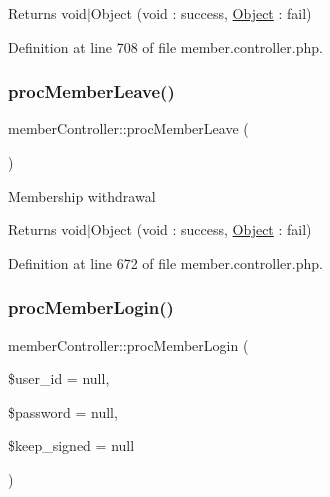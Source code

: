 \begin{DoxyReturn}{Returns}
void$\vert$\+Object (void \+: success, \hyperlink{classObject}{Object} \+: fail) 
\end{DoxyReturn}


Definition at line 708 of file member.\+controller.\+php.

\mbox{\label{classmemberController_a4c78a9114c62d27178d70bb4b8d19455}} 
\subsubsection{\texorpdfstring{proc\+Member\+Leave()}{procMemberLeave()}}
{\footnotesize\ttfamily member\+Controller\+::proc\+Member\+Leave (\begin{DoxyParamCaption}{ }\end{DoxyParamCaption})}

Membership withdrawal

\begin{DoxyReturn}{Returns}
void$\vert$\+Object (void \+: success, \hyperlink{classObject}{Object} \+: fail) 
\end{DoxyReturn}


Definition at line 672 of file member.\+controller.\+php.

\mbox{\label{classmemberController_a1e37a85198193c84a66b4472a677960d}} 
\subsubsection{\texorpdfstring{proc\+Member\+Login()}{procMemberLogin()}}
{\footnotesize\ttfamily member\+Controller\+::proc\+Member\+Login (\begin{DoxyParamCaption}\item[{}]{\$user\+\_\+id = {\ttfamily null},  }\item[{}]{\$password = {\ttfamily null},  }\item[{}]{\$keep\+\_\+signed = {\ttfamily null} }\end{DoxyParamCaption})}

